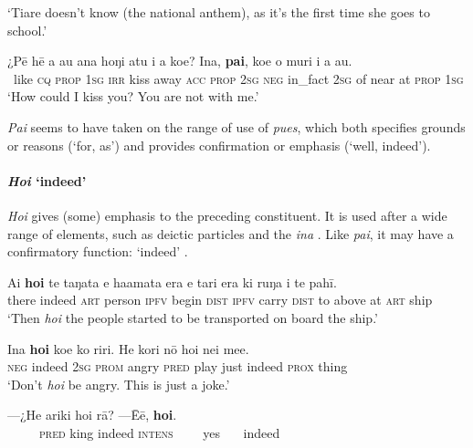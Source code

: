 \glt 
‘Tiare doesn’t know (the national anthem), as it’s the first time she goes to school.’ \textstyleExampleref{[R334.023]} 
\z

\ea\label{ex:4.164}
\gll ¿Pē hē a au ana hoŋi atu i a koe? {\ꞌ}Ina, \textbf{pa{\ꞌ}i}, koe o muri i a au. \\
~like \textsc{cq} \textsc{prop} \textsc{1sg} \textsc{irr} kiss away \textsc{acc} \textsc{prop} \textsc{2sg} \textsc{neg} in\_fact \textsc{2sg} of near at \textsc{prop} \textsc{1sg} \\

\glt
‘How could I kiss you? You are not with me.’ \textstyleExampleref{[R228.006–007]}
\z

\textit{Pa{\ꞌ}i} seems to have taken on the range of use of  \textit{pues}, which both specifies grounds or reasons (‘for, as’) and provides confirmation or emphasis (‘well, indeed’).
\paragraph{\textit{Ho{\ꞌ}i} ‘indeed’}\label{sec:4.5.4.2.2} \textit{Ho{\ꞌ}i} gives (some) emphasis to the preceding constituent. It is used after a wide range of elements, such as deictic particles  and the  \textit{{\ꞌ}ina} . Like \textit{pa{\ꞌ}i}, it may have a confirmatory function: ‘indeed’ .

\ea\label{ex:4.165}
\gll {\ꞌ}Ai \textbf{ho{\ꞌ}i} te taŋata e ha{\ꞌ}amata era e tari era ki ruŋa i te pahī. \\
there indeed \textsc{art} person \textsc{ipfv} begin \textsc{dist} \textsc{ipfv} carry \textsc{dist} to above at \textsc{art} ship \\

\glt 
‘Then \textit{ho{\ꞌ}i} the people started to be transported on board the ship.’ \textstyleExampleref{[R210.040]} 
\z

\ea\label{ex:4.166}
\gll {\ꞌ}Ina \textbf{ho{\ꞌ}i} koe ko riri. He kori nō ho{\ꞌ}i nei me{\ꞌ}e. \\
\textsc{neg} indeed \textsc{2sg} \textsc{prom} angry \textsc{pred} play just indeed \textsc{prox} thing \\

\glt 
‘Don’t \textit{ho{\ꞌ}i} be angry. This is just a joke.’ \textstyleExampleref{[R315.040–041]}
\z

\ea\label{ex:4.167}
\gll —¿He {\ꞌ}ariki ho{\ꞌ}i rā? —{\ꞌ}Ēē, \textbf{ho{\ꞌ}i}. \\
~~~~~\textsc{pred} king indeed \textsc{intens} ~~~~yes~~~ indeed \\

